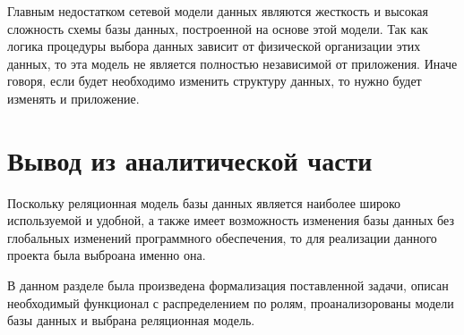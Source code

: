 Главным недостатком сетевой модели данных являются жесткость и высокая сложность схемы базы данных, построенной на основе этой модели. Так как логика процедуры выбора данных зависит от физической организации этих данных, то эта модель не является полностью независимой от приложения. Иначе говоря, если будет необходимо изменить структуру данных, то нужно будет изменять и приложение.


\section*{Вывод из аналитической части}
Поскольку реляционная модель базы данных является наиболее широко используемой и удобной, а также имеет возможность изменения базы данных без глобальных изменений программного обеспечения, то для реализации данного проекта была выброана именно она.

В данном разделе была произведена формализация поставленной задачи, описан необходимый функционал с распределением по ролям, проанализорованы модели базы данных и выбрана реляционная модель.